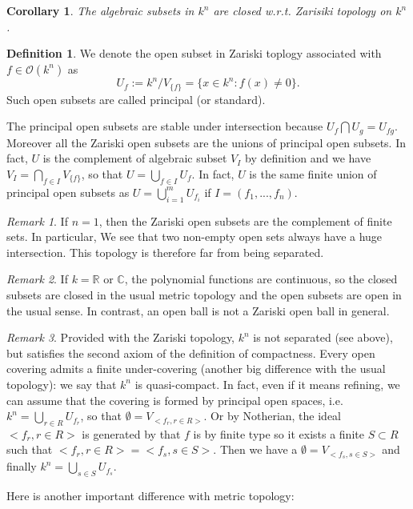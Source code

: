 \documentclass[12pt,a4paper,english]{article}
\theoremstyle{plain}
\newtheorem{coro}[thm]{Corollary}
\theoremstyle{definition}
\newtheorem{defi}{Definition}
\theoremstyle{remark}
\newtheorem*{rem}{Remark}
\begin{document}
\begin{coro}
The algebraic subsets in $k^{n}$ are closed w.r.t. Zarisiki topology on $k^{n}$.
\end{coro}
\begin{defi}
We denote the open subset in Zariski toplogy associated with $f\in \mathcal{O}(k^{n})$ as
\begin{equation*}
    U_{f}:=k^{n}/V_{\{f\}}=\{x\in k^{n}:f(x)\not=0\}.
\end{equation*}
Such open subsets are called principal (or standard).

\end{defi}
The principal open subsets are stable under intersection because $U_{f}\bigcap U_{g}=U_{fg}$. Moreover all the Zariski open subsets are the unions of principal open subsets. In fact, $U$ is the complement of algebraic subset $V_{I}$ by definition and we have $V_{I}=\bigcap_{f\in I}V_{\{f\}}$, so that $U=\bigcup_{f\in I}U_{f}$. In fact, $U$ is the same finite union of principal open subsets as $U=\bigcup_{i=1}^{m} U_{f_{i}}$ if $I=(f_{1},...,f_{n})$.
\begin{rem}
If $n=1$, then the Zariski open subsets are the complement of finite sets. In particular, We see that two non-empty open sets always have a huge intersection. This topology is therefore far from being separated.
\end{rem}
\begin{rem}
If $k=\mathbb{R}$ or $\mathbb{C}$, the polynomial functions are continuous, so the closed subsets are closed in the usual metric topology and the open subsets are open in the usual sense. In contrast, an open ball is not a Zariski open ball in general.
\end{rem}
\begin{rem}
Provided with the Zariski topology, $k^{n}$ is not separated (see above), but satisfies the second axiom of the definition of compactness. Every open covering admits a finite under-covering (another big difference with the usual topology): we say that $k^{n}$ is quasi-compact. In fact, even if it means refining, we can assume that the covering is formed by principal open spaces, i.e. $k^{n}=\bigcup_{r\in R}U_{f_{r}}$, so that $\emptyset=V_{<f_{r},r\in R>}$. Or by Notherian, the ideal $<f_{r},r\in R>$ is generated by that $f$ is by finite type so it exists a finite $S\subset R$ such that $<f_{r},r\in R>=<f_{s},s\in S>$. Then we have a $\emptyset=V_{<f_{s},s\in S>}$ and finally $k^{n}=\bigcup_{s\in S}U_{f_{s}}$. 
\end{rem}
Here is another important difference with metric topology:
\end{document}
